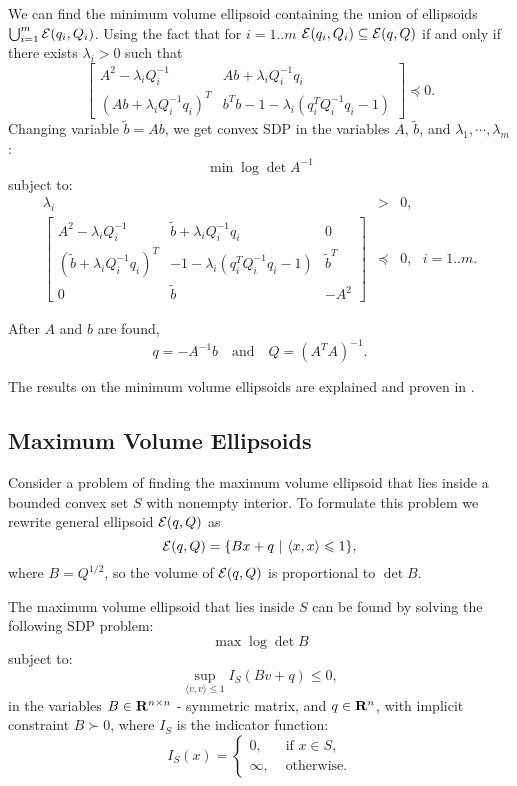 We can find the minimum volume ellipsoid containing the union of ellipsoids
$\bigcup_{i=1}^m\EE(q_i,Q_i)$.
Using the fact that for $i=1..m$ $\EE(q_i,Q_i)\subseteq\EE(q,Q)$
if and only if there exists $\lambda_i>0$ such that
\[ \left[\begin{array}{cc}
A^2 - \lambda_i Q_i^{-1} & Ab + \lambda_i Q_i^{-1}q_i\\
(Ab + \lambda_i Q_i^{-1}q_i)^T & b^Tb-1 - \lambda_i (q_i^TQ_i^{-1}q_i-1) \end{array}
\right] \preceq 0 .\]
Changing variable $\tilde{b}=Ab$, we get convex SDP in the variables $A$,
$\tilde{b}$, and $\lambda_1,\cdots,\lambda_m$:
\[ \min \log \det A^{-1} \]
subject to:
\begin{eqnarray*}
\lambda_i & > & 0,\\
\left[\begin{array}{ccc}
A^2-\lambda_iQ_i^{-1} & \tilde{b}+\lambda_iQ_i^{-1}q_i & 0 \\
(\tilde{b}+\lambda_iQ_i^{-1}q_i)^T & -1-\lambda_i(q_i^TQ_i^{-1}q_i-1) & \tilde{b}^T \\
0 & \tilde{b} & -A^2\end{array}\right] & \preceq & 0, ~~~ i=1..m.
\end{eqnarray*}

After $A$ and $b$ are found,
\[ q=-A^{-1}b ~~~ \mbox{ and } ~~~ Q=(A^TA)^{-1}. \]

The results on the minimum volume ellipsoids are explained
and proven in \cite{boyd04}.







\subsection{Maximum Volume Ellipsoids}
Consider a problem of finding the maximum volume ellipsoid that lies inside
a bounded convex set $S$ with nonempty interior.
To formulate this problem we rewrite general ellipsoid $\EE(q,Q)$ as
\[ \EE(q,Q) = \{Bx + q ~|~ \langle x,x\rangle\leq 1\}, \]
where $B=Q^{1/2}$, so the volume of $\EE(q,Q)$ is proportional to $\det B$.

The maximum volume ellipsoid that lies inside $S$ can be found by solving
the following SDP problem:
\[ \max \log \det B \]
subject to:
\[ \sup_{\langle v,v\rangle\leq 1} I_S(Bv+q)\leq 0 ,\]
in the variables $B\in{\bf R}^{n\times n}$ - symmetric matrix, and
$q\in{\bf R}^n$, with implicit constraint $B\succ 0$, where $I_S$ is the
indicator function:
\[ I_S(x) = \left\{\begin{array}{ll}
0, & \mbox{ if } x\in S,\\
\infty, & \mbox{ otherwise.}\end{array}\right. \]

